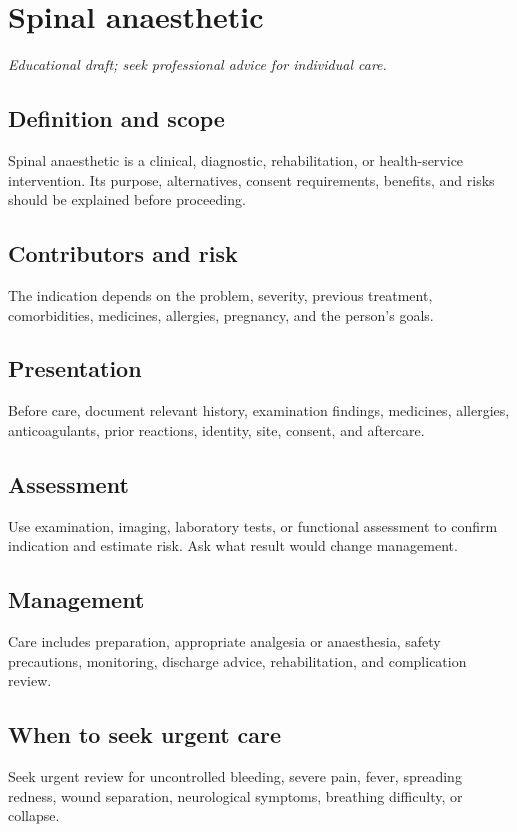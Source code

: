 \chapter{Spinal anaesthetic}
\medskip
\noindent\textit{Educational draft; seek professional advice for individual care.}

\section*{Definition and scope}
Spinal anaesthetic is a clinical, diagnostic, rehabilitation, or health-service intervention. Its purpose, alternatives, consent requirements, benefits, and risks should be explained before proceeding.

\section*{Contributors and risk}
The indication depends on the problem, severity, previous treatment, comorbidities, medicines, allergies, pregnancy, and the person’s goals.

\section*{Presentation}
Before care, document relevant history, examination findings, medicines, allergies, anticoagulants, prior reactions, identity, site, consent, and aftercare.

\section*{Assessment}
Use examination, imaging, laboratory tests, or functional assessment to confirm indication and estimate risk. Ask what result would change management.

\section*{Management}
Care includes preparation, appropriate analgesia or anaesthesia, safety precautions, monitoring, discharge advice, rehabilitation, and complication review.

\section*{When to seek urgent care}
Seek urgent review for uncontrolled bleeding, severe pain, fever, spreading redness, wound separation, neurological symptoms, breathing difficulty, or collapse.

